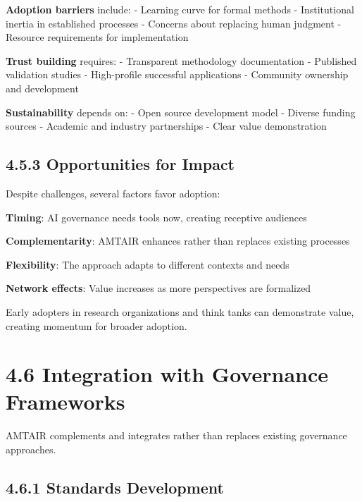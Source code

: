 \documentclass[
  11pt,
  letterpaper,
]{book}
\begin{document}
\textbf{Adoption barriers} include: - Learning curve for formal methods
- Institutional inertia in established processes - Concerns about
replacing human judgment - Resource requirements for implementation

\textbf{Trust building} requires: - Transparent methodology
documentation - Published validation studies - High-profile successful
applications - Community ownership and development

\textbf{Sustainability} depends on: - Open source development model -
Diverse funding sources - Academic and industry partnerships - Clear
value demonstration

\subsection*{4.5.3 Opportunities for
Impact}\label{sec-impact-opportunities}

Despite challenges, several factors favor adoption:

\textbf{Timing}: AI governance needs tools now, creating receptive
audiences

\textbf{Complementarity}: AMTAIR enhances rather than replaces existing
processes

\textbf{Flexibility}: The approach adapts to different contexts and
needs

\textbf{Network effects}: Value increases as more perspectives are
formalized

Early adopters in research organizations and think tanks can demonstrate
value, creating momentum for broader adoption.

\section*{4.6 Integration with Governance
Frameworks}\label{sec-governance-integration}


AMTAIR complements and integrates rather than replaces existing
governance approaches.

\subsection*{4.6.1 Standards
Development}\label{sec-standards-integration}
\end{document}
